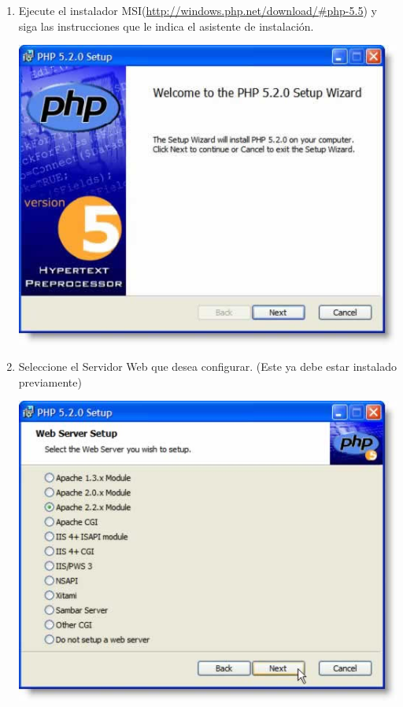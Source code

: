 \documentclass[11pt]{article} %
\begin{document}
\begin{enumerate}
\begin{enumerate}[a)]
\end{enumerate} 

\item Ejecute el instalador MSI(\url{http://windows.php.net/download/#php-5.5}) y siga las instrucciones que le indica el asistente de instalación.
\begin{center}
\includegraphics{Imagenes/install01.jpg}
\end{center}

\item Seleccione el Servidor Web que desea configurar. (Este ya debe estar instalado previamente)
\begin{center}
\includegraphics{Imagenes/install02.jpg}
\end{center}


\end{enumerate}
\end{document}
